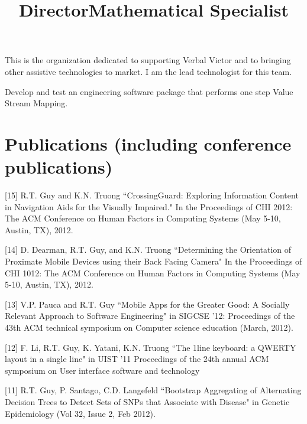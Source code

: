 \documentclass[overlapped,line,letterpaper]{res}
\begin{document}
\begin{resume}
 \title{Director}
 \begin{position}
This is the organization dedicated to supporting Verbal Victor and to bringing other assistive technologies to market. I am the lead technologist for this team.
 \end{position}

 \title{Mathematical Specialist}
 \begin{position}
    Develop and test an engineering software package that performs one step Value Stream Mapping.
 \end{position}



\section{\bf Publications (including conference publications)}

[15] R.T. Guy and K.N. Truong ``CrossingGuard: Exploring Information Content in Navigation Aids for the Visually Impaired." In the Proceedings of CHI 2012: The ACM Conference on Human Factors in Computing Systems (May 5-10, Austin, TX), 2012.

[14] D. Dearman, R.T. Guy, and K.N. Truong ``Determining the Orientation of Proximate Mobile Devices using their Back Facing Camera" In the Proceedings of CHI 1012: The ACM Conference on Human Factors in Computing Systems (May 5-10, Austin, TX), 2012.

[13] V.P. Pauca and R.T. Guy ``Mobile Apps for the Greater Good: A Socially Relevant Approach to Software Engineering" in SIGCSE '12: Proceedings of the 43th ACM technical symposium on Computer science education (March, 2012).

[12] F. Li, R.T. Guy, K. Yatani, K.N. Truong ``The 1line keyboard: a QWERTY layout in a single line" in UIST '11 Proceedings of the 24th annual ACM symposium on User interface software and technology

[11] R.T. Guy, P. Santago, C.D. Langefeld ``Bootstrap Aggregating of Alternating Decision Trees to Detect Sets of SNPs that Associate with Disease" in Genetic Epidemiology (Vol 32, Issue 2, Feb 2012). 


\end{resume}
\end{document}
